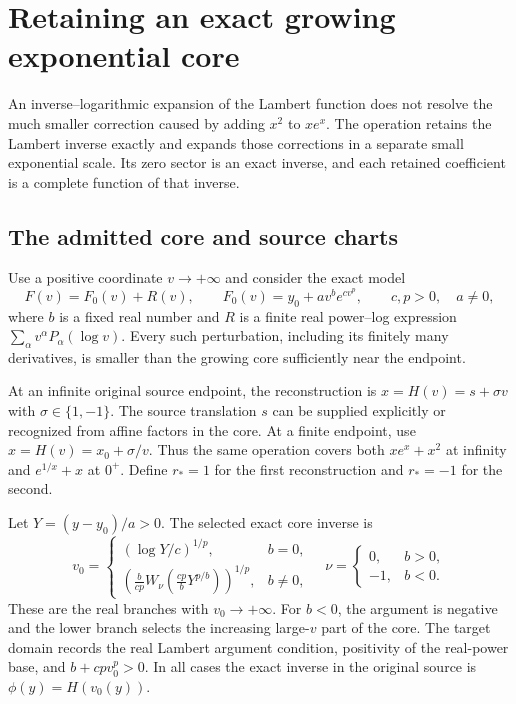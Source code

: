 \section{Retaining an exact growing exponential core}
\label{sec:exponential-core-perturbation}

An inverse--logarithmic expansion of the Lambert function does not resolve
the much smaller correction caused by adding $x^2$ to $xe^x$. The operation
 retains the Lambert inverse exactly
and expands those corrections in a separate small exponential scale.
Its zero sector is an exact inverse, and each retained coefficient is a
complete function of that inverse.

\subsection{The admitted core and source charts}

Use a positive coordinate $v\to+\infty$ and consider the exact model
\begin{equation}
 F(v)=F_0(v)+R(v),\qquad
 F_0(v)=y_0+a v^b e^{c v^p},
 \qquad c,p>0,\quad a\ne0,
 \label{eq:exponential-core-forward}
\end{equation}
where $b$ is a fixed real number and $R$ is a finite real power--log
expression $\sum_\alpha v^\alpha P_\alpha(\log v)$.
Every such perturbation, including its finitely many derivatives, is
smaller than the growing core sufficiently near the endpoint.

At an infinite original source endpoint, the reconstruction is
$x=H(v)=s+\sigma v$ with $\sigma\in\{1,-1\}$. The source translation
$s$ can be supplied explicitly or recognized from affine factors in the
core. At a finite endpoint, use $x=H(v)=x_0+\sigma/v$.
Thus the same operation covers both $xe^x+x^2$ at infinity and
$e^{1/x}+x$ at $0^+$. Define $r_*=1$ for the first reconstruction and
$r_*=-1$ for the second.

Let $Y=(y-y_0)/a>0$. The selected exact core inverse is
\begin{equation}
 v_0=
 \begin{cases}
 (\log Y/c)^{1/p},&b=0,\\[0.3em]
 \displaystyle
 \left(\frac{b}{cp}
 W_\nu\!\left(\frac{cp}{b}Y^{p/b}\right)\right)^{1/p},&b\ne0,
 \end{cases}
 \quad
 \nu=\begin{cases}0,&b>0,\\-1,&b<0.\end{cases}
 \label{eq:exponential-core-exact-inverse}
\end{equation}
These are the real branches with $v_0\to+\infty$.
For $b<0$, the argument is negative and the lower branch selects the
increasing large-$v$ part of the core. The target domain records the real
Lambert argument condition, positivity of the real-power base, and
$b+cpv_0^p>0$. In all cases the exact inverse in the original source is
$\phi(y)=H(v_0(y))$.

